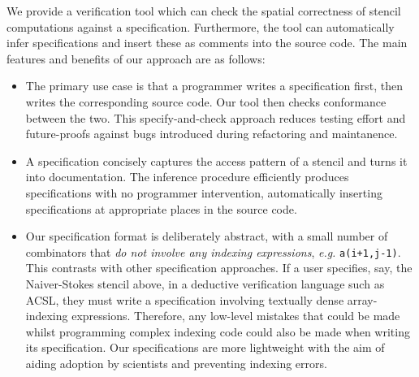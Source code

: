\documentclass[10pt,preprint]{sigplanconf}
\theoremstyle{definition}
\newcommand{\eg}{\emph{e.g.}}
\begin{document}
We provide a verification tool which can check the spatial correctness
of stencil computations against a specification. Furthermore, the tool
can automatically infer specifications and insert these as comments
into the source code. The main features and benefits of our approach
are as follows:
%
\begin{itemize}
\item The primary use case is that a programmer writes a specification first,
  then writes the corresponding source code. Our tool then checks conformance between
  the two. This specify-and-check approach reduces testing effort and
  future-proofs against bugs introduced during refactoring and maintanence.
%

\item A specification concisely captures the access pattern of a
  stencil and turns it into documentation. The inference procedure
  efficiently produces specifications with no programmer intervention,
  automatically inserting specifications at appropriate places in the
  source code.
%
%
\item Our specification format is deliberately abstract, with a small number of
  combinators that \emph{do not involve any indexing expressions}, \eg{}
  \texttt{a(i+1,j-1)}. This contrasts with other specification approaches. If a
  user specifies, say, the Naiver-Stokes stencil above, in a deductive
  verification language such as ACSL, they must write a specification involving
  textually dense array-indexing expressions. Therefore, any low-level mistakes
  that could be made whilst programming complex indexing code could also be
  made when writing its specification. Our specifications are more lightweight
  with the aim of aiding adoption by scientists and preventing indexing errors.
\end{itemize}
\end{document}
